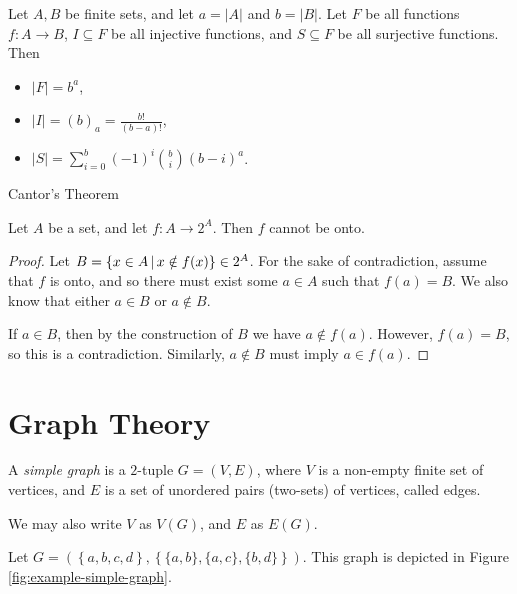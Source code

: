 \begin{prop}
    Let $A, B$ be finite sets, and let $a = |A|$ and $b = |B|$. Let $F$ be all functions $f: A \to B$, $I \subseteq F$ be all injective functions, and $S \subseteq F$ be all surjective functions. Then
    \begin{itemize}
        \item $|F| = b^a$,
        \item $|I| = (b)_a = \frac{b!}{(b-a)!}$,
        \item $|S| = \sum_{i=0}^b(-1)^i\binom{b}{i}(b-i)^a$.
    \end{itemize}
\end{prop}

\begin{thm}
    Cantor's Theorem

    Let $A$ be a set, and let $f: A \to 2^A$. Then $f$ cannot be onto.
\end{thm}

\begin{proof}
    Let $B = \left\{x \in A \,\middle|\, x \notin f(x) \right\} \in 2^A$. For the sake of contradiction, assume that $f$ is onto, and so there must exist some $a \in A$ such that $f(a) = B$. We also know that either $a \in B$ or $a \notin B$.

    If $a \in B$, then by the construction of $B$ we have $a \notin f(a)$. However, $f(a) = B$, so this is a contradiction. Similarly, $a \notin B$ must imply $a \in f(a)$.
\end{proof}

\section{Graph Theory}

\begin{defn}
    A \emph{simple graph} is a $2$-tuple $G = (V, E)$, where $V$ is a non-empty finite set of vertices, and $E$ is a set of unordered pairs (two-sets) of vertices, called edges.
\end{defn}

\begin{rmk}
    We may also write $V$ as $V(G)$, and $E$ as $E(G)$.
\end{rmk}

\begin{exmp} Let $G = \left(\left\{a, b, c, d\right\}, \left\{\{a, b\}, \{a, c\}, \{b, d\}\right\}\right)$. This graph is depicted in Figure \ref{fig:example-simple-graph}.
\end{exmp}

